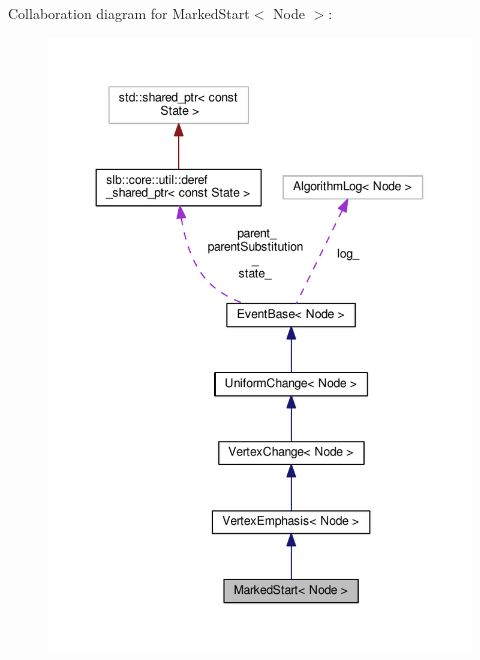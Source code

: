 Collaboration diagram for Marked\+Start$<$ Node $>$\+:\nopagebreak
\begin{figure}[H]
\begin{center}
\leavevmode
\includegraphics[width=350pt]{structMarkedStart__coll__graph}
\end{center}
\end{figure}
